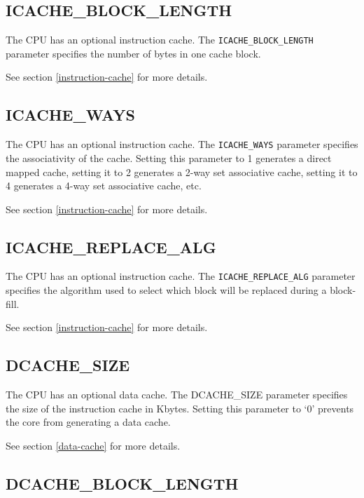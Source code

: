 \subsection{ICACHE\_BLOCK\_LENGTH}\label{icache_block_length}

The CPU has an optional instruction cache. The \texttt{ICACHE\_BLOCK\_LENGTH}
parameter specifies the number of bytes in one cache block.

See section \ref{instruction-cache}  for more details.

\subsection{ICACHE\_WAYS}\label{icache_ways}

The CPU has an optional instruction cache. The \texttt{ICACHE\_WAYS} parameter
specifies the associativity of the cache. Setting this parameter to 1
generates a direct mapped cache, setting it to 2 generates a 2-way set
associative cache, setting it to 4 generates a 4-way set associative
cache, etc.

See section \ref{instruction-cache}  for more details.

\subsection{ICACHE\_REPLACE\_ALG}\label{icache_replace_alg}

The CPU has an optional instruction cache. The \texttt{ICACHE\_REPLACE\_ALG}
parameter specifies the algorithm used to select which block will be
replaced during a block-fill.

See section \ref{instruction-cache}  for more details.

\subsection{DCACHE\_SIZE}\label{dcache_size}

The CPU has an optional data cache. The DCACHE\_SIZE parameter specifies
the size of the instruction cache in Kbytes. Setting this parameter to
`0' prevents the core from generating a data cache.

See section \ref{data-cache}  for more details.

\subsection{DCACHE\_BLOCK\_LENGTH}\label{dcache_block_length}

